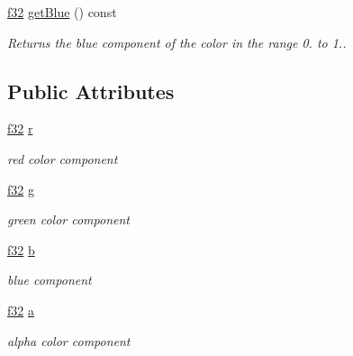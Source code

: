 \begin{DoxyCompactItemize}
\mbox{\label{classirr_1_1video_1_1SColorf_a769bee9289a9c08d6a8977f562112b95}} 
\hyperlink{namespaceirr_a0277be98d67dc26ff93b1a6a1d086b07}{f32} \hyperlink{classirr_1_1video_1_1SColorf_a769bee9289a9c08d6a8977f562112b95}{get\+Blue} () const
\begin{DoxyCompactList}\small\item\em Returns the blue component of the color in the range 0. to 1.. \end{DoxyCompactList}\end{DoxyCompactItemize}
\subsection*{Public Attributes}
\begin{DoxyCompactItemize}
\item 
\mbox{\label{classirr_1_1video_1_1SColorf_aaabdd1e2ef53f24e9dec70d5d531e425}} 
\hyperlink{namespaceirr_a0277be98d67dc26ff93b1a6a1d086b07}{f32} \hyperlink{classirr_1_1video_1_1SColorf_aaabdd1e2ef53f24e9dec70d5d531e425}{r}
\begin{DoxyCompactList}\small\item\em red color component \end{DoxyCompactList}\item 
\mbox{\label{classirr_1_1video_1_1SColorf_abcb076ccba5f994d6dca52aed397d59a}} 
\hyperlink{namespaceirr_a0277be98d67dc26ff93b1a6a1d086b07}{f32} \hyperlink{classirr_1_1video_1_1SColorf_abcb076ccba5f994d6dca52aed397d59a}{g}
\begin{DoxyCompactList}\small\item\em green color component \end{DoxyCompactList}\item 
\mbox{\label{classirr_1_1video_1_1SColorf_a82d235f32be8c4a5a07acb45abde726e}} 
\hyperlink{namespaceirr_a0277be98d67dc26ff93b1a6a1d086b07}{f32} \hyperlink{classirr_1_1video_1_1SColorf_a82d235f32be8c4a5a07acb45abde726e}{b}
\begin{DoxyCompactList}\small\item\em blue component \end{DoxyCompactList}\item 
\mbox{\label{classirr_1_1video_1_1SColorf_add63387fd1fd80d09500b85ae679b050}} 
\hyperlink{namespaceirr_a0277be98d67dc26ff93b1a6a1d086b07}{f32} \hyperlink{classirr_1_1video_1_1SColorf_add63387fd1fd80d09500b85ae679b050}{a}
\begin{DoxyCompactList}\small\item\em alpha color component \end{DoxyCompactList}\end{DoxyCompactItemize}


